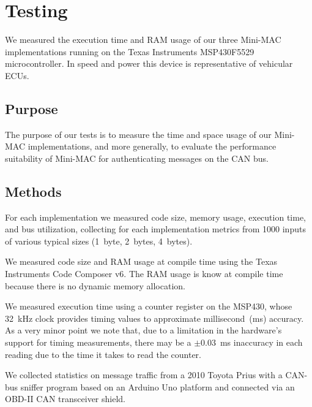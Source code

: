 \section{Testing}
\label{testing}

We measured the execution time and RAM usage of our three Mini-MAC implementations 
running on the Texas Instruments MSP430F5529 microcontroller. 
In speed and power this device is representative of vehicular ECUs.

\subsection{Purpose}
\label{purpose}

The purpose of our tests is to measure the time and space usage of our Mini-MAC implementations, and more generally,
to evaluate the performance suitability of Mini-MAC for authenticating messages on the CAN bus.

\subsection{Methods}
\label{methods}

For each implementation we measured code size, memory usage, execution time, and bus utilization,
collecting for each implementation metrics from 1000 inputs of various typical sizes (1~byte, 2~bytes, 4~bytes).  

We measured code size and RAM usage at compile time using 
the Texas Instruments Code Composer v6.
The RAM usage is know at compile time because there is no
dynamic memory allocation.

We measured execution time using a counter register on the MSP430, 
whose 32~kHz clock provides timing values to approximate millisecond~(ms) accuracy. 
As a very minor point we note that, due to a limitation in the hardware's
support for timing measurements, 
there may be a $\pm$0.03~ms inaccuracy in each reading due to the
time it takes to read the counter.

We collected statistics on message traffic from a 2010 Toyota Prius with a CAN-bus sniffer program 
based on an Arduino Uno platform and connected via an OBD-II CAN transceiver shield.

%

